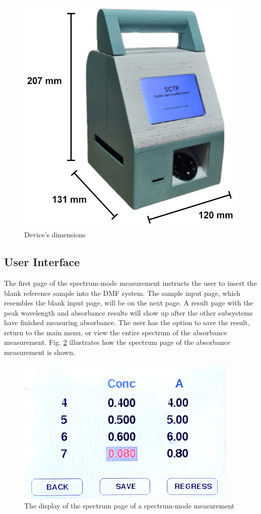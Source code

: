 \documentclass[conference]{IEEEtran}
\begin{document}
\begin{figure}[htbp]
    \centerline{\includegraphics[angle=90,scale=0.12]{SCTP_size.png}}
    \caption{Device's dimensions}
    \label{device_dimensions}
    \end{figure}

\subsection{User Interface}
The first page of the spectrum-mode measurement instructs the user to insert the blank reference sample into the DMF system.
The sample input page, which resembles the blank input page, will be on the next page.
A result page with the peak wavelength and absorbance results will show up after the other subsystems have finished measuring absorbance.
The user has the option to save the result, return to the main menu, or view the entire spectrum of the absorbance measurement.
Fig. \ref{lcd-spectrum} illustrates how the spectrum page of the absorbance measurement is shown.

    \begin{figure}[htbp]
    \centerline{\includegraphics[scale=0.6]{lcd-spectrum.png}}
    \caption{The display of the spectrum page of a spectrum-mode measurement}
    \label{lcd-spectrum}
    \end{figure}
\end{document}
